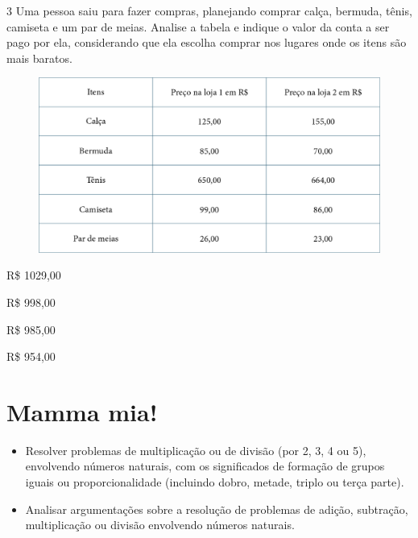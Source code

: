 \pagebreak
\num{3} Uma pessoa saiu para fazer compras, planejando comprar calça, bermuda, tênis, camiseta e um par de meias. Analise a tabela e indique o valor da conta a ser pago por ela, considerando que ela escolha comprar nos lugares onde os
itens são mais baratos.

\begin{figure}[htpb!]
\includegraphics[width=\textwidth]{./media/image102.png}
\end{figure}

\begin{escolha}
\item R\$ 1029,00

\item R\$ 998,00

\item R\$ 985,00

\item R\$ 954,00
\end{escolha}

\chapter{Mamma mia!}

\vspace*{-1.5cm}


\begin{itemize}
\item Resolver problemas de multiplicação ou de divisão (por 2, 3, 4 ou 5),
envolvendo números naturais, com os significados de formação de grupos
iguais ou proporcionalidade (incluindo dobro, metade, triplo ou terça
parte).

\item Analisar argumentações sobre a resolução de problemas de adição,
subtração, multiplicação ou divisão envolvendo números naturais.
\end{itemize}

